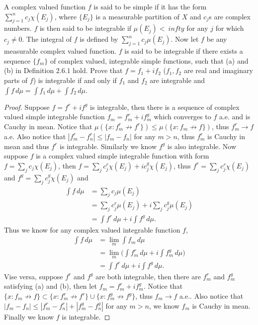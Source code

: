 \begin{pro}%
	A complex valued function $f$ is said to be simple if it has the form $\sum_{j=1}^n c_j \chi(E_j)$, where $\{E_j\}$ is a measurable partition of $X$ and $c_j$s are complex numbers. $f$ is then said to be integrable if $\mu(E_j)<\
	infty$ for any $j$ for which $c_j\neq 0$. The integral of $f$ is defined by $\sum_{j=1}^n c_j\mu(E_j)$. Now let $f$ be any measurable complex valued function. $f$ is said to be integrable if there exists a sequence $\{f_m\}$ of complex valued, integrable simple functions, such that (a) and (b) in Definition $2.6.1$ hold. Prove that $f=f_1+if_2$ ($f_1,f_2$ are real and imaginary parts of $f$) is integrable if and only if $f_1$ and $f_2$ are integrable and $\int f\,d\mu=\int f_1\,d\mu+\int f_2\,d\mu$.
\end{pro}
\begin{proof}
	Suppose $f=f^r+if^g$ is integrable, then there is a sequence of complex valued simple integrable function $f_m=f_m^r+if_m^g$ which converges to $f$ a.e. and is Cauchy in mean. Notice that $\mu(\{x\colon f_m^r\not\to f^r\})\leq \mu(\{x\colon f_m\not\to f\})$, thus $f_m^r\to f$ a.e. Also notice that $|f_m^r-f_n^r|\leq |f_m-f_n|$ for any $m>n$, thus $f_m^r$ is Cauchy in mean and thus $f^r$ is integrable. Similarly we know $f^g$ is also integrable. Now suppose $f$ is a complex valued simple integrable function with form $f=\sum_{j} c_j\chi(E_j)$, then $f=\sum_j c_j^r\chi(E_j)+ic_j^g \chi(E_j)$, thus $f^r=\sum_j c_j^r\chi(E_j)$ and $f^g=\sum_j c_j^g\chi(E_j)$ and
	\begin{align*}
		\int f\,d\mu&=\sum_j c_j\mu(E_j)\\
		&=\sum_j c_j^r\mu(E_j)+i\sum_j c_j^g\mu(E_j)\\
		&=\int f^r\,d\mu+i\int f^g\,d\mu.
	\end{align*}
	Thus we know for any complex valued integrable function $f$,
	\begin{align*}
		\int f\,d\mu&=\lim_m \int f_m\,d\mu\\
		&=\lim_m \bigg(\int f_m^r\,d\mu+i\int f_m^g\,d\mu\bigg)\\
		&=\int f^r\,d\mu+i\int f^g\,d\mu.
	\end{align*}
	Vise versa, suppose $f^r$ and $f^g$ are both integrable, then there are $f_m^r$ and $f_m^g$ satisfying (a) and (b), then let $f_m=f_m^r+if_m^g$. Notice that $\{x\colon f_m\not\to f\}\subset \{x\colon f_m^r\not\to f^r\}\cup\{x\colon f_m^g\not\to f^g\}$, thus $f_m\to f$ a.e.. Also notice that $|f_m-f_n|\leq |f_m^r-f_n^r|+|f_m^g-f_n^g|$ for any $m>n$, we know $f_m$ is Cauchy in mean. Finally we know $f$ is integrable.
\end{proof}

